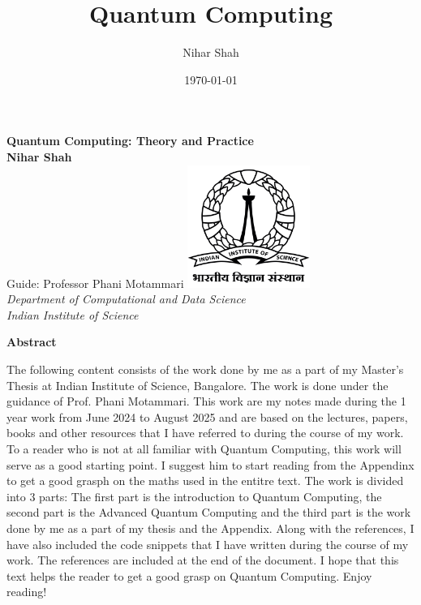 \documentclass[12pt, oneside]{book}
\theoremstyle{definition}
\theoremstyle{definition}
\theoremstyle{remark}
\newcommand{\abstractname}{Abstract}  %
\newenvironment{abstract}{%
\clearpage
\null\vfill
\begin{center}%
    \bfseries \abstractname
\end{center}}%
{\vfill\null}
\begin{document}
\frontmatter  %

\title{\vspace{-3.0cm}Quantum Computing}  %
\author{Nihar Shah}  %
\date{\today}  %
\maketitle  %

\begin{center}
\vspace*{2cm}
\textbf{Quantum Computing: Theory and Practice}\\[1cm]
\textbf{Nihar Shah}\\[1cm]
Guide: Professor Phani Motammari
\vfill
\includegraphics[width=0.3\textwidth]{../images/IISc_Master_Seal_Black.jpg}\\[1cm]
\large \textit{Department of Computational and Data Science}\\
\large \textit{Indian Institute of Science}
\vfill
\end{center}

\frontmatter

\begin{abstract}
The following  content consists of the work done by me as a part of my Master's Thesis at Indian
Institute of Science, Bangalore. The work is done under the guidance of Prof. Phani Motammari. 
This work are my notes made during the 1 year work from June 2024 to August 2025 and are based on the
lectures, papers, books and other resources that I have referred to during the course of my work.
To a reader who is not at all familiar with Quantum Computing, this work will serve as a good starting point. 
I suggest him to start reading from the Appendinx to get a good grasph on the maths used in the entitre text. 
The work is divided into 3 parts: The first part is the introduction to Quantum Computing, the second part is the
Advanced Quantum Computing and the third part is the work done by me as a part of my thesis and the Appendix. Along with the references, 
I have also included the code snippets that I have written during the course of my work. The references are included at the end of the document.
I hope that this text helps the reader to get a good grasp on Quantum Computing. Enjoy reading!

\end{abstract}
\end{document}
